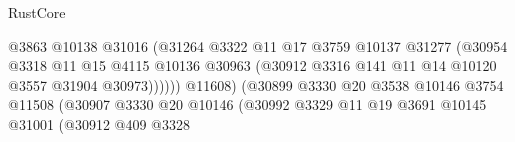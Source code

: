 \begin{lexlean}{RustCore}
\begin{coremodule}
                                                @3863
                                                @10138
                                                @31016
                                                (@31264
                                                  @3322
                                                  @11
                                                  @17
                                                  @3759
                                                  @10137
                                                  @31277
                                                  (@30954
                                                    @3318
                                                    @11
                                                    @15
                                                    @4115
                                                    @10136
                                                    @30963
                                                    (@30912
                                                      @3316
                                                      @141
                                                      @11
                                                      @14
                                                      @10120
                                                      @3557
                                                      @31904
                                                      @30973))))))
                                          @11608)
                                        (@30899
                                          @3330
                                          @20
                                          @3538
                                          @10146
                                          @3754
                                          @11508
                                          (@30907
                                            @3330
                                            @20
                                            @10146
                                            (@30992
                                              @3329
                                              @11
                                              @19
                                              @3691
                                              @10145
                                              @31001
                                              (@30912
                                                @409
                                                @3328

\end{coremodule}
\end{lexlean}
